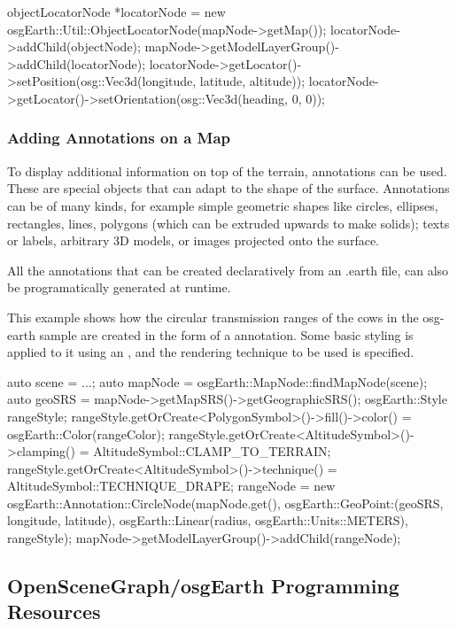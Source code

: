 \begin{cpp}
objectLocatorNode *locatorNode =
    new osgEarth::Util::ObjectLocatorNode(mapNode->getMap());
locatorNode->addChild(objectNode);
mapNode->getModelLayerGroup()->addChild(locatorNode);
locatorNode->getLocator()->setPosition(osg::Vec3d(longitude, latitude, altitude));
locatorNode->getLocator()->setOrientation(osg::Vec3d(heading, 0, 0));
\end{cpp}

\subsubsection{Adding Annotations on a Map}

To display additional information on top of the terrain, annotations can be
used. These are special objects that can adapt to the shape of the surface.
Annotations can be of many kinds, for example simple geometric shapes like circles,
ellipses, rectangles, lines, polygons (which can be extruded upwards to make
solids); texts or labels, arbitrary 3D models, or images projected onto the
surface.

All the annotations that can be created declaratively from an .earth file,
can also be programatically generated at runtime.

This example shows how the circular transmission ranges of the cows in the
osg-earth sample are created in the form of a
 annotation. Some basic styling is
applied to it using an , and the rendering technique to
be used is specified.

\begin{cpp}
auto scene = ...;
auto mapNode = osgEarth::MapNode::findMapNode(scene);
auto geoSRS = mapNode->getMapSRS()->getGeographicSRS();
osgEarth::Style rangeStyle;
rangeStyle.getOrCreate<PolygonSymbol>()->fill()->color() =
                                        osgEarth::Color(rangeColor);
rangeStyle.getOrCreate<AltitudeSymbol>()->clamping() =
                                        AltitudeSymbol::CLAMP_TO_TERRAIN;
rangeStyle.getOrCreate<AltitudeSymbol>()->technique() =
                                        AltitudeSymbol::TECHNIQUE_DRAPE;
rangeNode = new osgEarth::Annotation::CircleNode(mapNode.get(),
    osgEarth::GeoPoint:(geoSRS, longitude, latitude),
    osgEarth::Linear(radius, osgEarth::Units::METERS), rangeStyle);
mapNode->getModelLayerGroup()->addChild(rangeNode);
\end{cpp}


\subsection{OpenSceneGraph/osgEarth Programming Resources}

